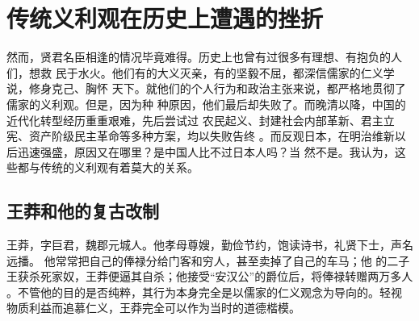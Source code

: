 \section{传统义利观在历史上遭遇的挫折}

然而，贤君名臣相逢的情况毕竟难得。历史上也曾有过很多有理想、有抱负的人们，想救
民于水火。他们有的大义灭亲，有的坚毅不屈，都深信儒家的仁义学说，修身克己、胸怀
天下。就他们的个人行为和政治主张来说，都严格地贯彻了儒家的义利观。但是，因为种
种原因，他们最后却失败了。而晚清以降，中国的近代化转型经历重重艰难，先后尝试过
农民起义、封建社会内部革新、君主立宪、资产阶级民主革命等多种方案，均以失败告终
。而反观日本，在明治维新以后迅速强盛，原因又在哪里？是中国人比不过日本人吗？当
然不是。我认为，这些都与传统的义利观有着莫大的关系。

\subsection{王莽和他的复古改制}

王莽，字巨君，魏郡元城人。他孝母尊嫂，勤俭节约，饱读诗书，礼贤下士，声名远播。
\parencite{wkpd-wm}他常常把自己的俸禄分给门客和穷人，甚至卖掉了自己的车马；他
的二子王获杀死家奴，王莽便逼其自杀；他接受“安汉公”的爵位后，将俸禄转赠两万多人
。不管他的目的是否纯粹，其行为本身完全是以儒家的仁义观念为导向的。轻视
物质利益而追慕仁义，王莽完全可以作为当时的道德楷模。

